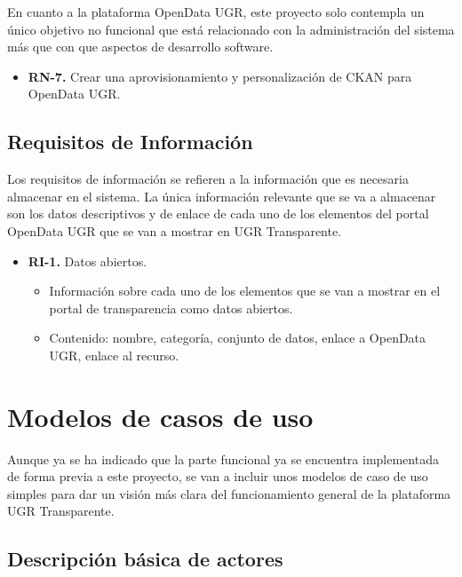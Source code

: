 En cuanto a la plataforma OpenData UGR, este proyecto solo contempla un único objetivo no funcional que está relacionado con
la administración del sistema más que con que aspectos de desarrollo software.

\begin{itemize}
  \item \textbf{RN-7.} Crear una aprovisionamiento y personalización de CKAN para OpenData UGR.
\end{itemize}

\subsection{Requisitos de Información}

Los requisitos de información se refieren a la información que es necesaria almacenar en el sistema. La única información 
relevante que se va a almacenar son los datos descriptivos y de enlace de cada uno de los elementos del portal OpenData UGR 
que se van a mostrar en UGR Transparente.

\newpage
\begin{itemize}
  \item \textbf{RI-1.} Datos abiertos.
  \begin{itemize}
    \item Información sobre cada uno de los elementos que se van a mostrar en el portal de transparencia como datos abiertos.
    \item Contenido: nombre, categoría, conjunto de datos, enlace a OpenData UGR, enlace al recurso.
  \end{itemize}
\end{itemize}

\section{Modelos de casos de uso}

Aunque ya se ha indicado que la parte funcional ya se encuentra implementada de forma previa a este proyecto, se van a incluir
unos modelos de caso de uso simples para dar un visión más clara del funcionamiento general de la plataforma UGR Transparente.

\subsection{Descripción básica de actores}

